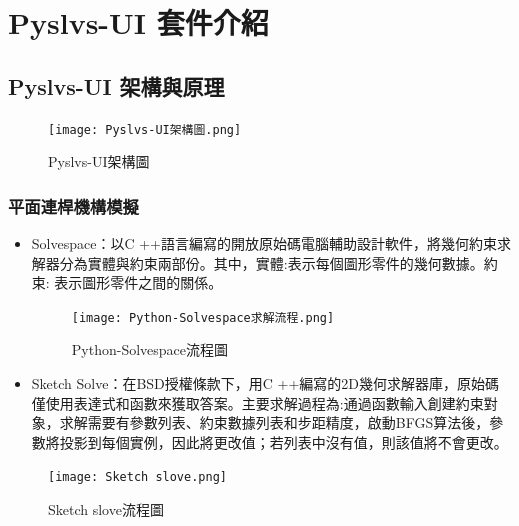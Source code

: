 \documentclass[14pt,a4paper]{report}  %
\newcommand{\fourteen}{\fontsize{14pt}{\baselineskip}\selectfont}%
\begin{document}
{      \chapter{Pyslvs-UI 套件介紹}
      \section{Pyslvs-UI 架構與原理}
       \fourteen{Pyslvs-UI是一套利用Python3與PyQt5建立的平面機構模擬與合成系統。機構模擬與合成的主要核心包括Python-Solvespace幾何約束求解程式庫、三角幾何函式程式庫(tinycadlib)、演算程式庫(ADesign)、幾何約束求解程式庫(bgfs)、類型合成程式庫(topologic)、數目合成程式庫(number)等。其中，ADesign演算程式庫內包含Real-coded Genetic Algorithm (RGA)、Differential Evolution(DE)與Firefly Algorithm (Firefly)等三種，用於平面機構尺寸合成演算}
       \begin{figure}[H]
        \centering
        \texttt{[image: Pyslvs-UI架構圖.png]} 
        \caption{Pyslvs-UI架構圖} 
        \label{fig:scale}
    	\end{figure}
    	
    	
      \subsection{平面連桿機構模擬}
      \begin{itemize} 
      \item Solvespace：以C ++語言編寫的開放原始碼電腦輔助設計軟件，將幾何約束求解器分為實體與約束兩部份。其中，實體:表示每個圖形零件的幾何數據。約束: 表示圖形零件之間的關係。

		\begin{figure}[H]
        \centering
        \texttt{[image: Python-Solvespace求解流程.png]} 
        \caption{Python-Solvespace流程圖} 
        \label{fig:scale}
    	\end{figure}
    	
      \item Sketch Solve：在BSD授權條款下，用C ++編寫的2D幾何求解器庫，原始碼僅使用表達式和函數來獲取答案。主要求解過程為:通過函數輸入創建約束對象，求解需要有參數列表、約束數據列表和步距精度，啟動BFGS算法後，參數將投影到每個實例，因此將更改值；若列表中沒有值，則該值將不會更改。
      	\end{itemize} 
      	
		\begin{figure}[H]
        \centering
        \texttt{[image: Sketch slove.png]} 
        \caption{Sketch slove流程圖} 
        \label{fig:scale}
    	\end{figure}
    	
}
\end{document}
